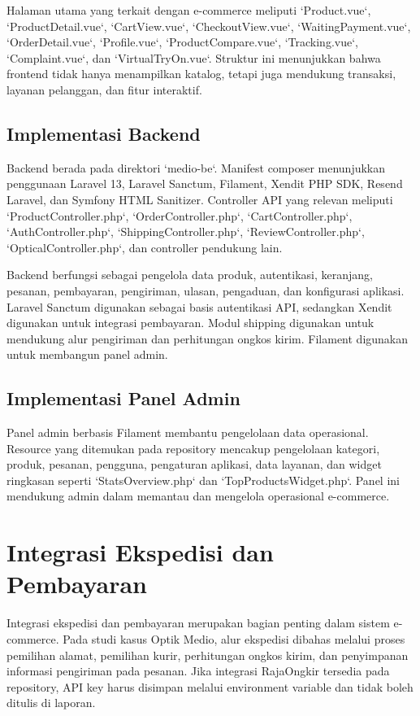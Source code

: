 \documentclass[12pt,a4paper,oneside]{report}
\newcommand{\proyekstudi}{Optik Medio}
\begin{document}
Halaman utama yang terkait dengan e-commerce meliputi `Product.vue`, `ProductDetail.vue`, `CartView.vue`, `CheckoutView.vue`, `WaitingPayment.vue`, `OrderDetail.vue`, `Profile.vue`, `ProductCompare.vue`, `Tracking.vue`, `Complaint.vue`, dan `VirtualTryOn.vue`. Struktur ini menunjukkan bahwa frontend tidak hanya menampilkan katalog, tetapi juga mendukung transaksi, layanan pelanggan, dan fitur interaktif.

\subsection{Implementasi Backend}

Backend berada pada direktori `medio-be`. Manifest composer menunjukkan penggunaan Laravel 13, Laravel Sanctum, Filament, Xendit PHP SDK, Resend Laravel, dan Symfony HTML Sanitizer. Controller API yang relevan meliputi `ProductController.php`, `OrderController.php`, `CartController.php`, `AuthController.php`, `ShippingController.php`, `ReviewController.php`, `OpticalController.php`, dan controller pendukung lain.

Backend berfungsi sebagai pengelola data produk, autentikasi, keranjang, pesanan, pembayaran, pengiriman, ulasan, pengaduan, dan konfigurasi aplikasi. Laravel Sanctum digunakan sebagai basis autentikasi API, sedangkan Xendit digunakan untuk integrasi pembayaran. Modul shipping digunakan untuk mendukung alur pengiriman dan perhitungan ongkos kirim. Filament digunakan untuk membangun panel admin.

\subsection{Implementasi Panel Admin}

Panel admin berbasis Filament membantu pengelolaan data operasional. Resource yang ditemukan pada repository mencakup pengelolaan kategori, produk, pesanan, pengguna, pengaturan aplikasi, data layanan, dan widget ringkasan seperti `StatsOverview.php` dan `TopProductsWidget.php`. Panel ini mendukung admin dalam memantau dan mengelola operasional e-commerce.

\section{Integrasi Ekspedisi dan Pembayaran}

Integrasi ekspedisi dan pembayaran merupakan bagian penting dalam sistem e-commerce. Pada studi kasus \proyekstudi, alur ekspedisi dibahas melalui proses pemilihan alamat, pemilihan kurir, perhitungan ongkos kirim, dan penyimpanan informasi pengiriman pada pesanan. Jika integrasi RajaOngkir tersedia pada repository, API key harus disimpan melalui environment variable dan tidak boleh ditulis di laporan.
\end{document}

